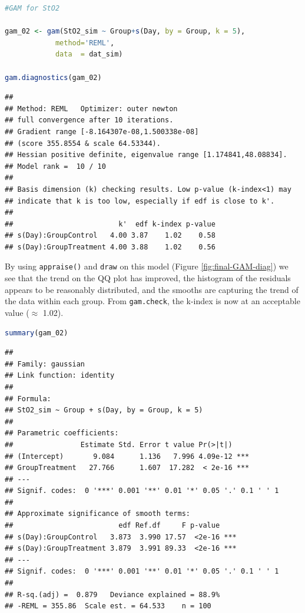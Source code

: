 \documentclass[
]{article}
\newcommand{\passthrough}[1]{#1}
\begin{document}
\begin{lstlisting}[language=R]
#GAM for StO2

gam_02 <- gam(StO2_sim ~ Group+s(Day, by = Group, k = 5),
            method='REML',
            data  = dat_sim)

gam.diagnostics(gam_02)
\end{lstlisting}

\begin{lstlisting}
## 
## Method: REML   Optimizer: outer newton
## full convergence after 10 iterations.
## Gradient range [-8.164307e-08,1.500338e-08]
## (score 355.8554 & scale 64.53344).
## Hessian positive definite, eigenvalue range [1.174841,48.08834].
## Model rank =  10 / 10 
## 
## Basis dimension (k) checking results. Low p-value (k-index<1) may
## indicate that k is too low, especially if edf is close to k'.
## 
##                         k'  edf k-index p-value
## s(Day):GroupControl   4.00 3.87    1.02    0.58
## s(Day):GroupTreatment 4.00 3.88    1.02    0.56
\end{lstlisting}

By using \passthrough{\lstinline!appraise()!} and \passthrough{\lstinline!draw!} on this model (Figure \ref{fig:final-GAM-diag}) we see that the trend on the QQ plot has improved, the histogram of the residuals appears to be reasonably distributed, and the smooths are capturing the trend of the data within each group. From \passthrough{\lstinline!gam.check!}, the k-index is now at an acceptable value (\(\approx\) 1.02).

\begin{lstlisting}[language=R]
summary(gam_02)
\end{lstlisting}

\begin{lstlisting}
## 
## Family: gaussian 
## Link function: identity 
## 
## Formula:
## StO2_sim ~ Group + s(Day, by = Group, k = 5)
## 
## Parametric coefficients:
##                Estimate Std. Error t value Pr(>|t|)    
## (Intercept)       9.084      1.136   7.996 4.09e-12 ***
## GroupTreatment   27.766      1.607  17.282  < 2e-16 ***
## ---
## Signif. codes:  0 '***' 0.001 '**' 0.01 '*' 0.05 '.' 0.1 ' ' 1
## 
## Approximate significance of smooth terms:
##                         edf Ref.df     F p-value    
## s(Day):GroupControl   3.873  3.990 17.57  <2e-16 ***
## s(Day):GroupTreatment 3.879  3.991 89.33  <2e-16 ***
## ---
## Signif. codes:  0 '***' 0.001 '**' 0.01 '*' 0.05 '.' 0.1 ' ' 1
## 
## R-sq.(adj) =  0.879   Deviance explained = 88.9%
## -REML = 355.86  Scale est. = 64.533    n = 100
\end{lstlisting}
\end{document}

